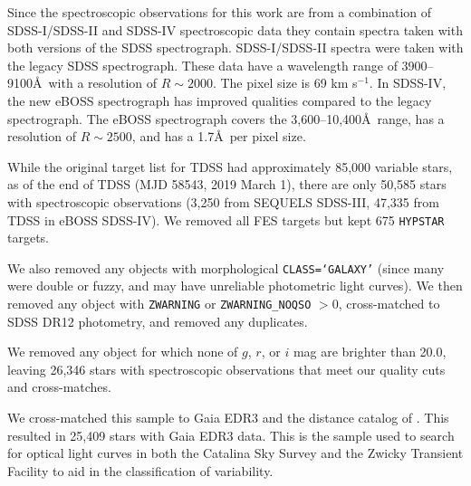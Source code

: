 \documentclass[twocolumn, tighten, astrosymb]{aastex631}
\begin{document}
Since the spectroscopic observations for this work are from a combination of SDSS-I/SDSS-II and SDSS-IV spectroscopic data they contain spectra taken with both versions of the SDSS spectrograph. SDSS-I/SDSS-II spectra were taken with the legacy SDSS spectrograph. These data have a wavelength range of 3900--9100\AA\ with a resolution of $R \sim 2000$. The pixel size is 69 km s$^{-1}$. In SDSS-IV, the new eBOSS spectrograph \citep{SDSS_spectrograph} has improved qualities compared to the legacy spectrograph. The eBOSS spectrograph covers the 3,600--10,400\AA\ range, has a resolution of $R \sim 2500$, and has a 1.7\AA\ per pixel size.

While the original target list for TDSS had approximately 85,000 variable stars, as of the end of TDSS (MJD 58543, 2019 March 1), there are only 50,585 stars with spectroscopic observations (3,250 from SEQUELS SDSS-III, 47,335 from TDSS in eBOSS SDSS-IV). We removed all FES targets but kept 675 \texttt{HYPSTAR} targets.

We also removed any objects with morphological \texttt{CLASS=`GALAXY'} (since many were double or fuzzy, and may have unreliable photometric light curves). We then removed any object with \texttt{ZWARNING} or \texttt{ZWARNING\_NOQSO} $> 0$, cross-matched to SDSS DR12 \citep{SDSS_DR12} photometry, and removed any duplicates. 

We removed any object for which none of $g$, $r$, or $i$ mag are brighter than 20.0, leaving 26,346 stars with spectroscopic observations that meet our quality cuts and cross-matches.

We cross-matched this sample to Gaia EDR3 \citep{GaiaEDR3} and the distance catalog of \citet{GaiaEDR3_dist}. This resulted in 25,409 stars with Gaia EDR3 data. This is the sample used to search for optical light curves in both the Catalina Sky Survey and the Zwicky Transient Facility to aid in the classification of variability.


\end{document}
